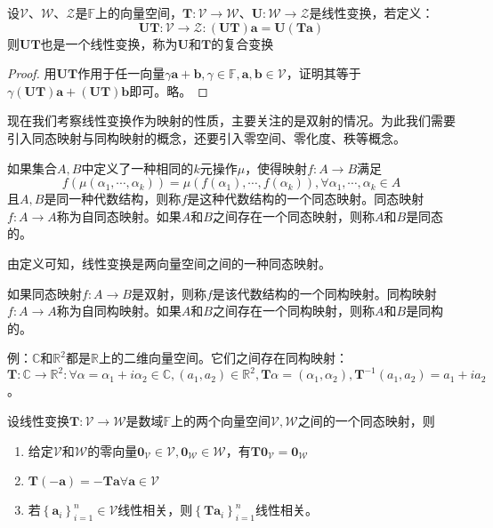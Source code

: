 \documentclass[main.tex]{subfiles}
\begin{document}
\begin{theorem}
设$\mathcal{V}$、$\mathcal{W}$、$\mathcal{Z}$是$\mathbb{F}$上的向量空间，$\mathbf{T}:\mathcal{V}\rightarrow\mathcal{W}$、$\mathbf{U}:\mathcal{W}\rightarrow\mathcal{Z}$是线性变换，若定义：
\[\mathbf{UT}:\mathcal{V}\rightarrow\mathcal{Z}:\left(\mathbf{UT}\right)\mathbf{a}=\mathbf{U}\left(\mathbf{Ta}\right)\]
则$\mathbf{UT}$也是一个线性变换，称为$\mathbf{U}$和$\mathbf{T}$的复合变换
\label{theo:composed_transform}
\end{theorem}
\begin{proof}
用$\mathbf{UT}$作用于任一向量$\gamma\mathbf{a}+\mathbf{b},\gamma\in\mathbb{F},\mathbf{a},\mathbf{b}\in\mathcal{V}$，证明其等于$\gamma\left(\mathbf{UT}\right)\mathbf{a}+\left(\mathbf{UT}\right)\mathbf{b}$即可。略。
\end{proof}

现在我们考察线性变换作为映射的性质，主要关注的是双射的情况。为此我们需要引入同态映射与同构映射的概念，还要引入零空间、零化度、秩等概念。

\begin{definition}[同态映射]
如果集合$A,B$中定义了一种相同的$k$元操作$\mu$，使得映射$f:A\rightarrow B$满足
\[f\left(\mu\left(\alpha_1,\cdots,\alpha_k\right)\right)=\mu\left(f\left(\alpha_1\right),\cdots,f\left(\alpha_k\right)\right),\forall\alpha_1,\cdots,\alpha_k\in A\]
且$A,B$是同一种代数结构，则称$f$是这种代数结构的一个同态映射。同态映射$f:A\rightarrow A$称为自同态映射。如果$A$和$B$之间存在一个同态映射，则称$A$和$B$是同态的。
\end{definition}

由定义可知，线性变换是两向量空间之间的一种同态映射。

\begin{definition}[同构映射]
如果同态映射$f:A\rightarrow B$是双射，则称$f$是该代数结构的一个同构映射。同构映射$f:A\rightarrow A$称为自同构映射。如果$A$和$B$之间存在一个同构映射，则称$A$和$B$是同构的。
\end{definition}

例：$\mathbb{C}$和$\mathbb{R}^2$都是$\mathbb{R}$上的二维向量空间。它们之间存在同构映射：$\mathbf{T}:\mathbb{C}\rightarrow\mathbb{R}^2:\forall \alpha=\alpha_1+i\alpha_2\in\mathbb{C},\left(a_1,a_2\right)\in\mathbb{R}^2,\mathbf{T}\alpha=\left(\alpha_1,\alpha_2\right),\mathbf{T}^{-1}\left(a_1,a_2\right)=a_1+ia_2$。

\begin{theorem}
设线性变换$\mathbf{T}:\mathcal{V}\rightarrow\mathcal{W}$是数域$\mathbb{F}$上的两个向量空间$\mathcal{V},\mathcal{W}$之间的一个同态映射，则
\begin{enumerate}
    \item 给定$\mathcal{V}$和$\mathcal{W}$的零向量$\mathbf{0}_\mathcal{V}\in\mathcal{V},\mathbf{0}_\mathcal{W}\in\mathcal{W}$，有$\mathbf{T0}_\mathcal{V}=\mathbf{0}_\mathcal{W}$
    \item $\mathbf{T}\left(-\mathbf{a}\right)=-\mathbf{Ta}\forall\mathbf{a}\in\mathcal{V}$
    \item 若$\left\{\mathbf{a}_i\right\}_{i=1}^n\in\mathcal{V}$线性相关，则$\left\{\mathbf{Ta}_i\right\}_{i=1}^n$线性相关。
\end{enumerate}
\end{theorem}
\end{document}
